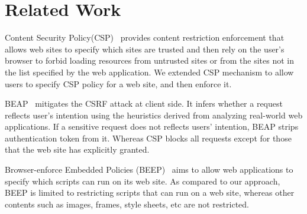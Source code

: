 \section{Related Work}
\label{sec:relwork}
Content Security Policy(CSP)~\cite{csp} provides content restriction
enforcement that allows web sites to specify which sites are trusted
and then rely on the user’s browser to forbid loading resources from
untrusted sites or from the sites not in the list specified by the web
application.  We extended CSP mechanism to allow users to specify CSP
policy for a web site, and then enforce it. 

BEAP~\cite{beap} mitigates the CSRF attack at client side. It infers
whether a request reflects user's intention using the heuristics
derived from analyzing real-world web applications. If a sensitive
request does not reflects users' intention, BEAP strips authentication
token from it. Whereas CSP blocks all requests except for those that
the web site has explicitly granted.  

Browser-enforce Embedded Policies (BEEP)~\cite{beep} aims to allow web
applications to specify which scripts can run on its web site. As
compared to our approach, BEEP is limited to restricting scripts that
can run on a web site, whereas other contents such as images, frames,
style sheets, etc are not restricted.
